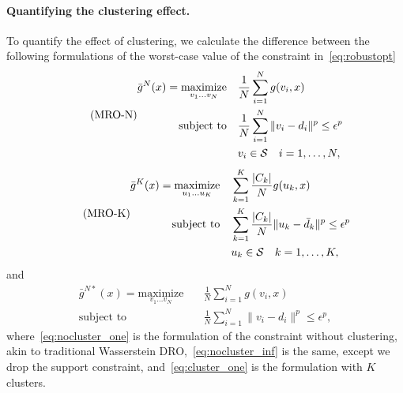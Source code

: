 \documentclass[12pt]{article}
\theoremstyle{thmstyleone}%
\theoremstyle{thmstyletwo}%
\theoremstyle{thmstylethree}%
\begin{document}
\paragraph{Quantifying the clustering effect.}%
\label{par:quantify_clustering_effect_}
To quantify the effect of clustering, we calculate the difference between the following formulations of the worst-case value of the constraint in~\eqref{eq:robustopt}
\begin{equation}
	\tag{MRO-N}
	\begin{aligned}
	\label{eq:nocluster_one}
	\bar{g}^N(x) = \underset{v_1\dots v_N}{\text{maximize}} &\quad\frac{1}{N} \sum_{i=1} ^N g(v_i, x) \\
	\mbox{subject to} & \quad \frac{1}{N} \sum_{i=1} ^N  \| v_i - d_i \|^p \le \epsilon^p\\
	& \quad v_i\in \mathcal{S} \quad i = 1,\dots,N,
	\end{aligned}
\end{equation}
\begin{equation}
	\tag{MRO-K}
	\label{eq:cluster_one}
	\begin{aligned}
		\bar{g}^K(x) = \underset{u_1\dots u_K}{\text{maximize}} &\quad  \sum_{k=1} ^K  \frac{|C_k|}{N} g(u_k, x) \\
	\mbox{subject to} & \quad\sum_{k=1} ^K \frac{|C_k|}{N}  \| u_k - \bar{d}_k \|^p \le \epsilon^p\\
	& \quad u_k\in \mathcal{S} \quad k = 1,\dots,K,
	\end{aligned}
\end{equation}
and
\begin{equation}
	\tag{MRO-N*}
	\label{eq:nocluster_inf}
	\begin{aligned}
		\bar{g}^{N*}(x) = \underset{v_1\dots v_N}{\text{maximize}} &\quad\frac{1}{N} \sum_{i=1} ^N g(v_i, x) \\
		\mbox{subject to} & \quad \frac{1}{N} \sum_{i=1} ^N  \| v_i - d_i \|^p \le \epsilon^p,
		\end{aligned}
\end{equation}
where~\eqref{eq:nocluster_one} is the formulation of the constraint without clustering, akin to traditional Wasserstein \gls{DRO},~\eqref{eq:nocluster_inf} is the same, except we drop the support constraint, and~\eqref{eq:cluster_one} is the formulation with $K$ clusters.
\end{document}
